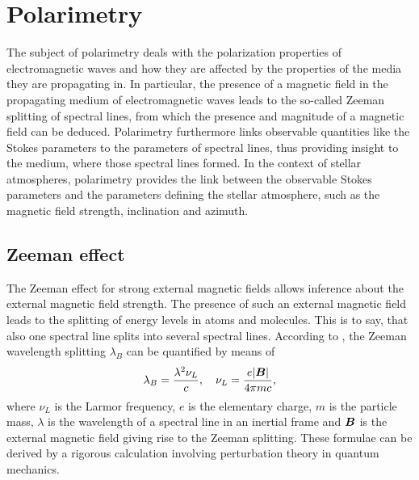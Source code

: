 \documentclass[a4paper,12pt]{report}
\begin{document}
\section{Polarimetry}
The subject of polarimetry deals with the polarization properties of electromagnetic waves and how they are affected by the properties of the media they are propagating in. In particular, the presence of a magnetic field in the propagating medium of electromagnetic waves leads to the so-called Zeeman splitting of spectral lines, from which the presence and magnitude of a magnetic field can be deduced. Polarimetry furthermore links observable quantities like the Stokes parameters to the parameters of spectral lines, thus providing insight to the medium, where those spectral lines formed. In the context of stellar atmospheres, polarimetry provides the link between the observable Stokes parameters and the parameters defining the stellar atmosphere, such as the magnetic field strength, inclination and azimuth.

\subsection{Zeeman effect}
The Zeeman effect for strong external magnetic fields allows inference about the external magnetic field strength. The presence of such an external magnetic field leads to the splitting of energy levels in atoms and molecules. This is to say, that also one spectral line splits into several spectral lines. According to \cite[p.123]{delToroIniesta.2003}, the Zeeman wavelength splitting $\lambda_B$ can be quantified by means of \begin{equation}\label{eq:zeeman}
\lambda_B = \frac{\lambda^2 \nu_L}{c}, \quad \nu_L = \frac{e|\bm{B}|}{4\pi m c},
\end{equation} where $\nu_L$ is the Larmor frequency, $e$ is the elementary charge, $m$ is the particle mass, $\lambda$ is the wavelength of a spectral line in an inertial frame and $\bm{B}$ is the external magnetic field giving rise to the Zeeman splitting. These formulae can be derived by a rigorous calculation involving perturbation theory in quantum mechanics.
\end{document}
